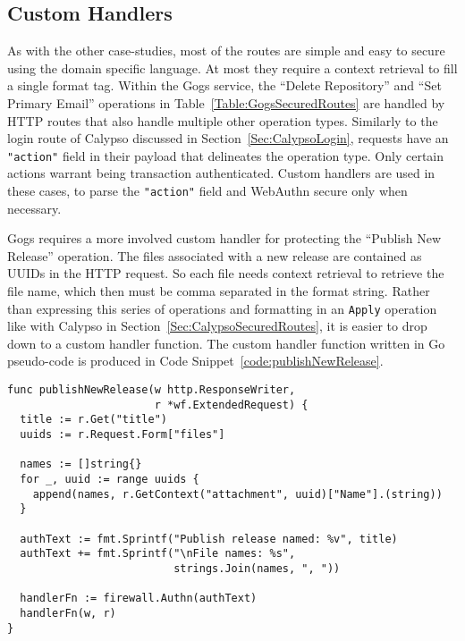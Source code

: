 \subsection{Custom Handlers}\label{Sec:Gogs_CustomHandlers}

As with the other case-studies, most of the routes are simple and easy to secure using the domain specific language. At most they require a context retrieval to fill a single format tag. Within the Gogs service, the ``Delete Repository'' and ``Set Primary Email'' operations in Table~\ref{Table:GogsSecuredRoutes} are handled by HTTP routes that also handle multiple other operation types. Similarly to the login route of Calypso discussed in Section~\ref{Sec:CalypsoLogin}, requests have an \lstinline{"action"} field in their payload that delineates the operation type. Only certain actions warrant being transaction authenticated. Custom handlers are used in these cases, to parse the \lstinline{"action"} field and WebAuthn secure only when necessary.




Gogs requires a more involved custom handler for protecting the ``Publish New Release'' operation. The files associated with a new release are contained as UUIDs in the HTTP request. So each file needs context retrieval to retrieve the file name, which then must be comma separated in the format string. Rather than expressing this series of operations and formatting in an \lstinline{Apply} operation like with Calypso in Section~\ref{Sec:CalypsoSecuredRoutes}, it is easier to drop down to a custom handler function. The custom handler function written in Go pseudo-code is produced in Code Snippet~\ref{code:publishNewRelease}.

\begin{lstlisting}[float=h,label=code:publishNewRelease,caption=A custom handler in Go pseudo-code to secure the Gogs operation for publishing a new release.]
func publishNewRelease(w http.ResponseWriter, 
                       r *wf.ExtendedRequest) {
  title := r.Get("title")
  uuids := r.Request.Form["files"]

  names := []string{}
  for _, uuid := range uuids {
    append(names, r.GetContext("attachment", uuid)["Name"].(string))
  }

  authText := fmt.Sprintf("Publish release named: %v", title)
  authText += fmt.Sprintf("\nFile names: %s", 
                          strings.Join(names, ", "))

  handlerFn := firewall.Authn(authText)
  handlerFn(w, r)
}
\end{lstlisting}

